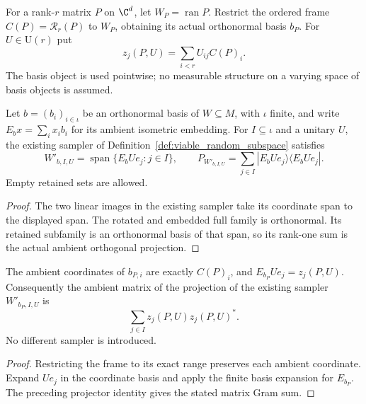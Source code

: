 \begin{definition}
    \label{def:canonical_range_sampling_basis}
    \leanok
    For a rank-$r$ matrix $P$ on $\C^d$, let $W_P=\operatorname{ran}P$.
    Restrict the ordered frame $C(P)=\mathcal R_r(P)$ to $W_P$, obtaining
    its actual orthonormal basis $b_P$. For $U\in\mathrm U(r)$ put
    \[
        z_j(P,U)=\sum_{i<r}U_{ij}C(P)_i.
    \]
    The basis object is used pointwise; no measurable structure on a
    varying space of basis objects is assumed.
\end{definition}

\begin{lemma}
    \label{lem:existing_sampler_rank_one_projection}
    \leanok
    Let $b=(b_i)_{i\in\iota}$ be an orthonormal basis of $W\subseteq M$,
    with $\iota$ finite, and write $E_bx=\sum_i x_i b_i$ for its ambient
    isometric embedding. For $I\subseteq\iota$ and a unitary $U$, the
    existing sampler of Definition~\ref{def:viable_random_subspace} satisfies
    \[
        W'_{b,I,U}=\operatorname{span}\{E_bUe_j:j\in I\},\qquad
        P_{W'_{b,I,U}}=\sum_{j\in I}|E_bUe_j\rangle\langle E_bUe_j|.
    \]
    Empty retained sets are allowed.
\end{lemma}
\begin{proof}\leanok
    The two linear images in the existing sampler take its coordinate
    span to the displayed span. The rotated and embedded full family is
    orthonormal. Its retained subfamily is an orthonormal basis of that
    span, so its rank-one sum is the actual ambient orthogonal projection.
\end{proof}

\begin{lemma}
    \label{lem:canonical_sampler_projector_formula}
    \leanok
    The ambient coordinates of $b_{P,i}$ are exactly $C(P)_i$, and
    $E_{b_P}Ue_j=z_j(P,U)$. Consequently the ambient matrix of the
    projection of the existing sampler $W'_{b_P,I,U}$ is
    \[
        \sum_{j\in I}z_j(P,U)z_j(P,U)^*.
    \]
    No different sampler is introduced.
\end{lemma}
\begin{proof}\leanok
    Restricting the frame to its exact range preserves each ambient
    coordinate. Expand $Ue_j$ in the coordinate basis and apply the
    finite basis expansion for $E_{b_P}$. The preceding projector identity
    gives the stated matrix Gram sum.
\end{proof}

